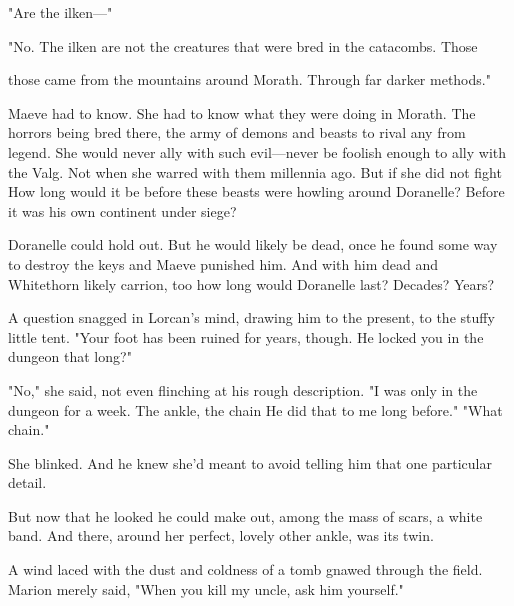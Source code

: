 "Are the ilken---"

"No. The ilken are not the creatures that were bred in the catacombs. Those

 those came from the mountains around Morath. Through far darker methods."

Maeve had to know. She had to know what they were doing in Morath. The horrors being bred there, the army of demons and beasts to rival any from legend. She would never ally with such evil---never be foolish enough to ally with the Valg. Not when she warred with them millennia ago. But if she did not fight  How long would it be before these beasts were howling around Doranelle? Before it was his own continent under siege?

Doranelle could hold out. But he would likely be dead, once he found some way to destroy the keys and Maeve punished him. And with him dead and Whitethorn likely carrion, too  how long would Doranelle last? Decades? Years?

A question snagged in Lorcan's mind, drawing him to the present, to the stuffy little tent. "Your foot has been ruined for years, though. He locked you in the dungeon that long?"

"No," she said, not even flinching at his rough description. "I was only in the dungeon for a week. The ankle, the chain  He did that to me long before." "What chain."

She blinked. And he knew she'd meant to avoid telling him that one particular detail.

But now that he looked  he could make out, among the mass of scars, a white band. And there, around her perfect, lovely other ankle, was its twin.

A wind laced with the dust and coldness of a tomb gnawed through the field. Marion merely said, "When you kill my uncle, ask him yourself."
